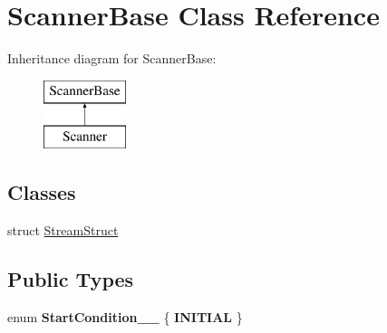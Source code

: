 \hypertarget{classScannerBase}{\section{Scanner\+Base Class Reference}
\label{classScannerBase}
}
Inheritance diagram for Scanner\+Base\+:\begin{figure}[H]
\begin{center}
\leavevmode
\includegraphics[height=2.000000cm]{classScannerBase}
\end{center}
\end{figure}
\subsection*{Classes}
\begin{DoxyCompactItemize}
\item 
struct \hyperlink{structScannerBase_1_1StreamStruct}{Stream\+Struct}
\end{DoxyCompactItemize}
\subsection*{Public Types}
\begin{DoxyCompactItemize}
\item 
\hypertarget{classScannerBase_a5c7a457813088d6b87650032becad324}{enum {\bfseries Start\+Condition\+\_\+\+\_\+} \{ {\bfseries I\+N\+I\+T\+I\+A\+L}
 \}}\label{classScannerBase_a5c7a457813088d6b87650032becad324}

\end{DoxyCompactItemize}

